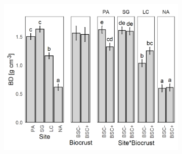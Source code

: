 \begin{figure}[htbp]
\begin{subfigure}[b]{0.32\textwidth}
    \end{subfigure}
    \hfill
    \begin{subfigure}[b]{0.32\textwidth}
        \centering
        \includegraphics[width=\linewidth]{img/M1-Figure_2-03.png}
    \end{subfigure}

    \vspace{0.3cm} %


\end{figure}
